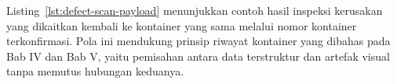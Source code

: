 Listing~\ref{lst:defect-scan-payload} menunjukkan contoh hasil inspeksi
kerusakan yang dikaitkan kembali ke kontainer yang sama melalui nomor kontainer
terkonfirmasi. Pola ini mendukung prinsip riwayat kontainer yang dibahas pada
Bab IV dan Bab V, yaitu pemisahan antara data terstruktur dan artefak visual
tanpa memutus hubungan keduanya.
